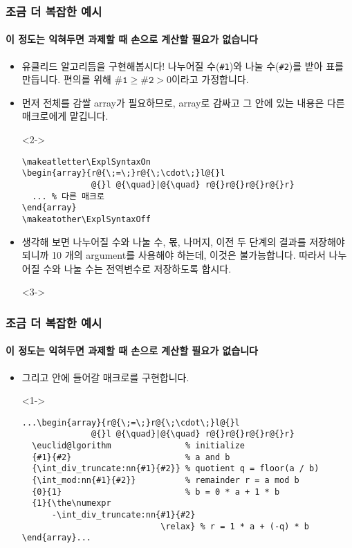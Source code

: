 
\begin{frame}[fragile]
  \frametitle{조금 더 복잡한 예시}
  \framesubtitle{이 정도는 익혀두면 과제할 때 손으로 계산할 필요가 없습니다}
  \begin{itemize}
    \item<1-> 유클리드 알고리듬을 구현해봅시다! 나누어질 수(\texttt{\#1})와 나눌 수(\texttt{\#2})를 받아 표를 만듭니다. 편의를 위해 $\texttt{\#1}\ge\texttt{\#2} > 0$이라고 가정합니다.
    \item<2-> 먼저 전체를 감쌀 array가 필요하므로, array로 감싸고 그 안에 있는 내용은 다른 매크로에게 맡깁니다.
    \item[]<2-> \vspace{-1.5em}\begin{verbatim}
\makeatletter\ExplSyntaxOn
\begin{array}{r@{\;=\;}r@{\;\cdot\;}l@{}l
              @{}l @{\quad}|@{\quad} r@{}r@{}r@{}r@{}r}
  ... % 다른 매크로
\end{array}
\makeatother\ExplSyntaxOff
    \end{verbatim}
    \item<3-> 생각해 보면 나누어질 수와 나눌 수, 몫, 나머지, 이전 두 단계의 결과를 저장해야 되니까 10 개의 argument를 사용해야 하는데, 이것은 불가능합니다. 따라서 나누어질 수와 나눌 수는 전역변수로 저장하도록 합시다.
    \item[]<3-> \texttt{\gdef\@@@@a{#1}\gdef\@@@@b{#2}}
  \end{itemize}
\end{frame}

\begin{frame}[fragile]
  \frametitle{조금 더 복잡한 예시}
  \framesubtitle{이 정도는 익혀두면 과제할 때 손으로 계산할 필요가 없습니다}
  \begin{itemize}
    \item<1-> 그리고 안에 들어갈 매크로를 구현합니다.
    \item[]<1-> \vspace{-1.5em}\begin{verbatim}
...\begin{array}{r@{\;=\;}r@{\;\cdot\;}l@{}l
              @{}l @{\quad}|@{\quad} r@{}r@{}r@{}r@{}r}
  \euclid@lgorithm               % initialize
  {#1}{#2}                       % a and b
  {\int_div_truncate:nn{#1}{#2}} % quotient q = floor(a / b)
  {\int_mod:nn{#1}{#2}}          % remainder r = a mod b
  {0}{1}                         % b = 0 * a + 1 * b
  {1}{\the\numexpr
      -\int_div_truncate:nn{#1}{#2}
                            \relax} % r = 1 * a + (-q) * b
\end{array}...
    \end{verbatim}
  \end{itemize}
\end{frame}

